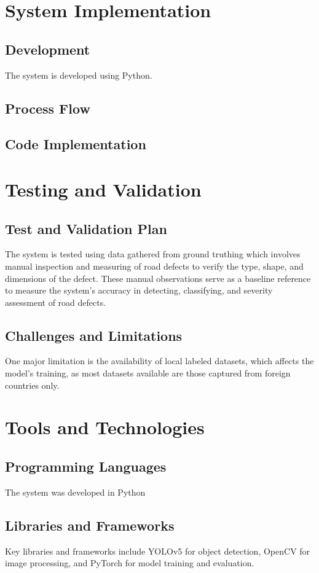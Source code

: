 \documentclass{report} %
\begin{document}
		\section{System Implementation}
		\subsection{Development}
		The system is developed using Python.
		\subsection{Process Flow}
		\subsection{Code Implementation}
		
		\section{Testing and Validation}
		\subsection{Test and Validation Plan}
		The system is tested using data gathered from ground truthing which involves manual inspection and measuring of road defects to verify the type, shape, and dimensions of the defect. These manual observations serve as a baseline reference to measure the system’s accuracy in detecting, classifying, and severity assessment of road defects. 
		
		\subsection{Challenges and Limitations}
		One major limitation is the availability of local labeled datasets, which affects the model’s training, as most datasets available are those captured from foreign countries only.
		
		\section{Tools and Technologies}
		\subsection{Programming Languages}
		The system was developed in Python
		\subsection{Libraries and Frameworks}
		Key libraries and frameworks include YOLOv5 for object detection, OpenCV for image processing, and PyTorch for model training and evaluation.
\end{document}
